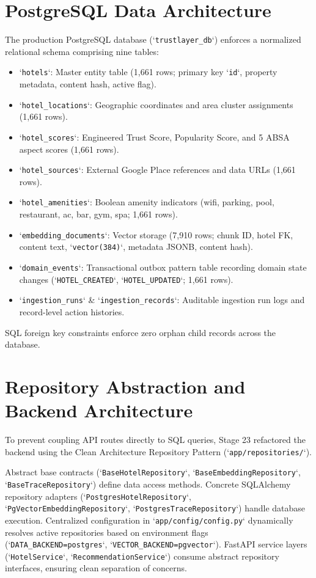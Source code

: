 \section{PostgreSQL Data Architecture}
The production PostgreSQL database (`\texttt{trustlayer\_db}`) enforces a normalized relational schema comprising nine tables:
\begin{itemize}
    \item `\texttt{hotels}`: Master entity table (1,661 rows; primary key `\texttt{id}`, property metadata, content hash, active flag).
    \item `\texttt{hotel\_locations}`: Geographic coordinates and area cluster assignments (1,661 rows).
    \item `\texttt{hotel\_scores}`: Engineered Trust Score, Popularity Score, and 5 ABSA aspect scores (1,661 rows).
    \item `\texttt{hotel\_sources}`: External Google Place references and data URLs (1,661 rows).
    \item `\texttt{hotel\_amenities}`: Boolean amenity indicators (wifi, parking, pool, restaurant, ac, bar, gym, spa; 1,661 rows).
    \item `\texttt{embedding\_documents}`: Vector storage (7,910 rows; chunk ID, hotel FK, content text, `\texttt{vector(384)}`, metadata JSONB, content hash).
    \item `\texttt{domain\_events}`: Transactional outbox pattern table recording domain state changes (`\texttt{HOTEL\_CREATED}`, `\texttt{HOTEL\_UPDATED}`; 1,661 rows).
    \item `\texttt{ingestion\_runs}` \& `\texttt{ingestion\_records}`: Auditable ingestion run logs and record-level action histories.
\end{itemize}

SQL foreign key constraints enforce zero orphan child records across the database.

\section{Repository Abstraction and Backend Architecture}
To prevent coupling API routes directly to SQL queries, Stage 23 refactored the backend using the Clean Architecture Repository Pattern (`\texttt{app/repositories/}`).

Abstract base contracts (`\texttt{BaseHotelRepository}`, `\texttt{BaseEmbeddingRepository}`, `\texttt{BaseTraceRepository}`) define data access methods. Concrete SQLAlchemy repository adapters (`\texttt{PostgresHotelRepository}`, `\texttt{PgVectorEmbeddingRepository}`, `\texttt{PostgresTraceRepository}`) handle database execution. Centralized configuration in `\texttt{app/config/config.py}` dynamically resolves active repositories based on environment flags (`\texttt{DATA\_BACKEND=postgres}`, `\texttt{VECTOR_BACKEND=pgvector}`). FastAPI service layers (`\texttt{HotelService}`, `\texttt{RecommendationService}`) consume abstract repository interfaces, ensuring clean separation of concerns.

